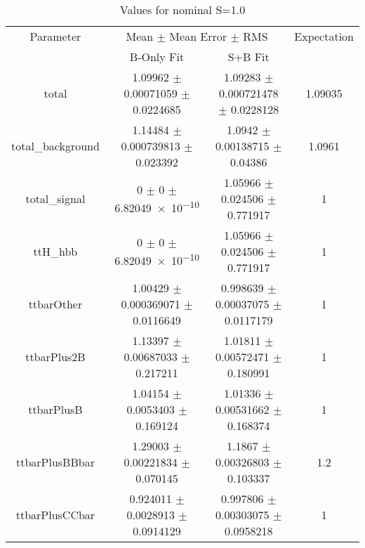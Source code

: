 \begin{table}
\centering
\caption{Values for nominal S=1.0}
\begin{tabular}{cccc}
\toprule
Parameter & \multicolumn{2}{c}{Mean $\pm$ Mean Error $\pm$ RMS} & Expectation\\
 & B-Only Fit & S+B Fit & \\
\midrule
total & \num{1.09962} $\pm$ \num{0.00071059} $\pm$ \num{0.0224685} & \num{1.09283} $\pm$ \num{0.000721478} $\pm$ \num{0.0228128} & \num{1.09035}\\
total\_background & \num{1.14484} $\pm$ \num{0.000739813} $\pm$ \num{0.023392} & \num{1.0942} $\pm$ \num{0.00138715} $\pm$ \num{0.04386} & \num{1.0961}\\
total\_signal & \num{0} $\pm$ \num{0} $\pm$ \num{6.82049e-10} & \num{1.05966} $\pm$ \num{0.024506} $\pm$ \num{0.771917} & \num{1}\\
ttH\_hbb & \num{0} $\pm$ \num{0} $\pm$ \num{6.82049e-10} & \num{1.05966} $\pm$ \num{0.024506} $\pm$ \num{0.771917} & \num{1}\\
ttbarOther & \num{1.00429} $\pm$ \num{0.000369071} $\pm$ \num{0.0116649} & \num{0.998639} $\pm$ \num{0.00037075} $\pm$ \num{0.0117179} & \num{1}\\
ttbarPlus2B & \num{1.13397} $\pm$ \num{0.00687033} $\pm$ \num{0.217211} & \num{1.01811} $\pm$ \num{0.00572471} $\pm$ \num{0.180991} & \num{1}\\
ttbarPlusB & \num{1.04154} $\pm$ \num{0.0053403} $\pm$ \num{0.169124} & \num{1.01336} $\pm$ \num{0.00531662} $\pm$ \num{0.168374} & \num{1}\\
ttbarPlusBBbar & \num{1.29003} $\pm$ \num{0.00221834} $\pm$ \num{0.070145} & \num{1.1867} $\pm$ \num{0.00326803} $\pm$ \num{0.103337} & \num{1.2}\\
ttbarPlusCCbar & \num{0.924011} $\pm$ \num{0.0028913} $\pm$ \num{0.0914129} & \num{0.997806} $\pm$ \num{0.00303075} $\pm$ \num{0.0958218} & \num{1}\\
\bottomrule
\end{tabular}
\end{table}